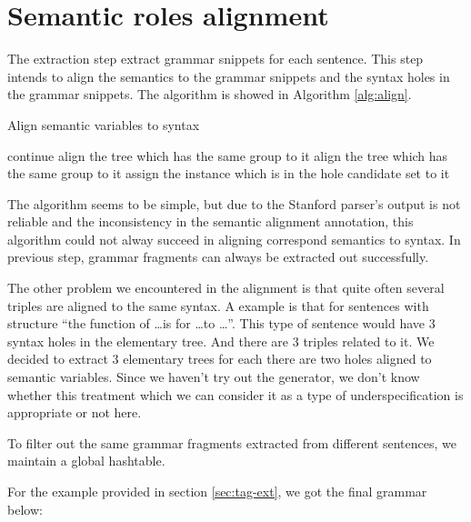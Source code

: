 \documentclass[a4paper]{article}
\begin{document}
\section{Semantic roles alignment}
The extraction step extract grammar snippets for each sentence. This step intends to align the semantics to the grammar snippets and the syntax holes in the grammar snippets. The algorithm is showed in Algorithm \ref{alg:align}.

\begin{algorithm}
    \caption{Align semantic variables to syntax}
    \label{alg:align}
    \begin{algorithmic}[1]
            \STATE continue
        \ELSE
            \STATE align the tree which has the same group to it
        \ENDIF
        \ENDFOR
        \STATE align the tree which has the same group to it
                \STATE assign the instance which is in the hole candidate set to it
            \ENDFOR
        \ENDFOR
    \end{algorithmic}
\end{algorithm}

The algorithm seems to be simple, but due to the Stanford parser's output is not reliable and the inconsistency in the semantic alignment annotation, this algorithm could not alway succeed in aligning correspond semantics to syntax. In previous step, grammar fragments can always be extracted out successfully.

The other problem we encountered in the alignment is that quite  often several triples are aligned to the same syntax. A example is that for sentences with structure ``the function of \ldots is for \ldots to \ldots''. This type of sentence would have 3 syntax holes in the elementary tree. And there are 3 triples related to it. We decided to extract 3 elementary trees for each there are two holes aligned to semantic variables. Since we haven't try out the generator, we don't know whether this treatment which we can consider it as a type of underspecification is appropriate or not here.

To filter out the same grammar fragments extracted from different sentences, we maintain a global hashtable.

For the example provided in section \ref{sec:tag-ext}, we got the final grammar below:
\end{document}

